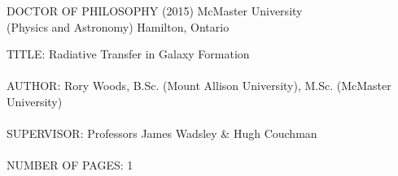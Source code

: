





\pagestyle{empty}
\vspace*{0.5in}

\noindent 
DOCTOR OF PHILOSOPHY (2015) \hspace{2.0cm} McMaster University \\
(Physics and Astronomy)     \hspace{4.2cm} Hamilton, Ontario 
\vspace{0.5in}

\noindent
TITLE: Radiative Transfer in Galaxy Formation \\ \\
AUTHOR: Rory Woods, B.Sc. (Mount Allison University), M.Sc. (McMaster University)\\ \\
SUPERVISOR: Professors James Wadsley \& Hugh Couchman\\ \\
NUMBER OF PAGES: 1


